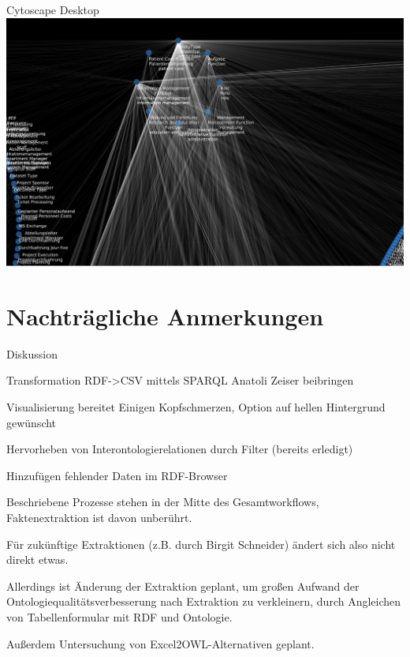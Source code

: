 \documentclass[14pt,aspectratio=1610]{beamer}
\begin{document}
\begin{frame}{Cytoscape Desktop}
\centering\includegraphics[width=\textwidth,height=\textheight,keepaspectratio]{img/types_classrelations_zoomed.png}
\end{frame}

\section{Nachträgliche Anmerkungen}

\begin{frame}{Diskussion}
\begin{itemize}
{
\item Transformation RDF->CSV mittels SPARQL Anatoli Zeiser beibringen
\item Visualisierung bereitet Einigen Kopfschmerzen, Option auf hellen Hintergrund gewünscht
\item Hervorheben von Interontologierelationen durch Filter (bereits erledigt)
\item Hinzufügen fehlender Daten im RDF-Browser
}
{
\item Beschriebene Prozesse stehen in der Mitte des Gesamtworkflows, Faktenextraktion ist davon unberührt.
\item Für zukünftige Extraktionen (z.B. durch Birgit Schneider) ändert sich also nicht direkt etwas.
\item Allerdings ist Änderung der Extraktion geplant, um großen Aufwand der Ontologiequalitätsverbesserung nach Extraktion zu verkleinern, durch Angleichen von Tabellenformular mit RDF und Ontologie.
\item Außerdem Untersuchung von Excel2OWL-Alternativen geplant.
}
\end{itemize}
\end{frame}
\end{document}
